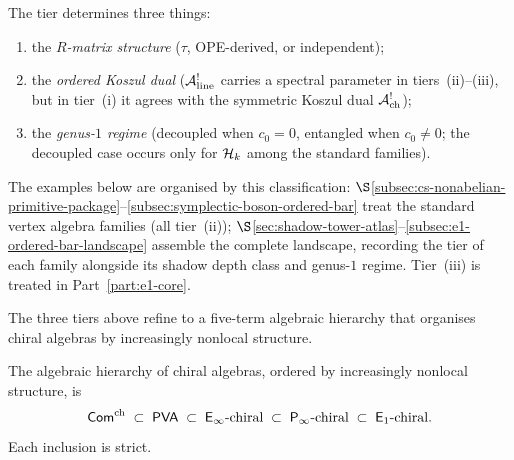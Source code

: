 \noindent
The tier determines three things:
\begin{enumerate}[label=(\alph*),nosep]
\item the \emph{$R$-matrix structure} ($\tau$, OPE-derived, or
 independent);
\item the \emph{ordered Koszul dual}
 ($\mathcal{A}^!_{\mathrm{line}}$ carries a spectral parameter
 in tiers~(ii)--(iii), but in tier~(i) it agrees with
 the symmetric Koszul dual $\mathcal{A}^!_{\mathrm{ch}}$);
\item the \emph{genus-$1$ regime} (decoupled when
 $c_0 = 0$, entangled when $c_0 \ne 0$; the decoupled
 case occurs only for $\mathcal{H}_k$ among the standard
 families).
\end{enumerate}

\noindent
The examples below are organised by this classification:
$\S$\ref{subsec:cs-nonabelian-primitive-package}--\ref{subsec:symplectic-boson-ordered-bar}
treat the standard vertex algebra families (all tier~(ii));
$\S$\ref{sec:shadow-tower-atlas}--\ref{subsec:e1-ordered-bar-landscape}
assemble the complete landscape, recording the tier of each family
alongside its shadow depth class and genus-$1$ regime.
Tier~(iii) is treated in
Part~\ref{part:e1-core}\@.

The three tiers above refine to a five-term algebraic hierarchy
that organises chiral algebras by increasingly nonlocal structure.

\begin{definition}
\label{def:v2-algebraic-hierarchy}
The algebraic hierarchy of chiral algebras, ordered by increasingly
nonlocal structure, is
\begin{equation}\label{eq:five-term-hierarchy}
 \mathsf{Com}^{\mathrm{ch}}
 \;\subset\;
 \mathsf{PVA}
 \;\subset\;
 \mathsf{E}_{\infty}\text{-chiral}
 \;\subset\;
 \mathsf{P}_{\infty}\text{-chiral}
 \;\subset\;
 \mathsf{E}_1\text{-chiral}.
\end{equation}
Each inclusion is strict.
\end{definition}

